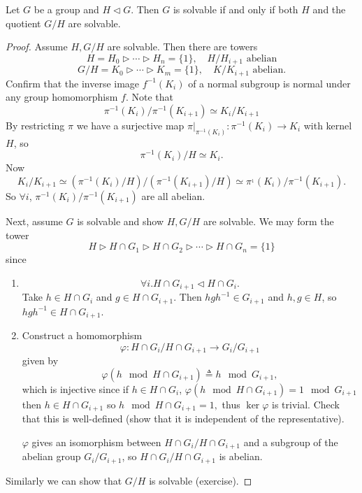 \documentclass{article}
\begin{document}
\begin{prop}
Let $G$ be a group and $H \triangleleft G$. Then $G$ is solvable if
and only if both $H$ and the quotient $G / H$ are solvable.
\end{prop}
\begin{proof}
Assume $H, G / H$ are solvable. Then there are towers
$$
H = H_0 \triangleright \cdots \triangleright H_n = \{ 1 \}, \quad
H/H_{i+1} \text{ abelian} 
$$
$$
G/H = K_0 \triangleright \cdots \triangleright K_m = \{ 1 \}, \quad
K/K_{i+1} \text{ abelian}.
$$
Confirm that the inverse image $f^{-1}(K_i)$ of a normal subgroup is
normal under any group homomorphism $f$. Note that
$$
\pi^{-1}(K_i) / \pi^{-1}(K_{i+1}) \simeq K_i / K_{i+1}
$$
By restricting $\pi$ we have a surjective map
$\pi|_{\pi^{-1}(K_i)} : \pi^{-1}(K_i) \to K_i$ with kernel $H$,
so
$$
\pi^{-1}(K_i) / H \simeq K_i.
$$
Now
$$
K_i / K_{i+1} \simeq (\pi^{-1}(K_i) / H) / (\pi^{-1}(K_{i+1}) / H)
             \simeq \pi^{_1}(K_i) / \pi^{-1}(K_{i+1}).
$$
So $\forall i$, $\pi^{-1}(K_i) / \pi^{-1}(K_{i+1})$ are all abelian.

Next, assume $G$ is solvable and show $H, G/H$ are solvable.
We may form the tower
$$
H \triangleright H \cap G_1 
  \triangleright H \cap G_2 
  \triangleright \cdots 
  \triangleright H \cap G_n = \{ 1 \}
$$
since
\begin{enumerate}
  \item{
    $$
    \forall i . H \cap G_{i+1} \triangleleft H \cap G_i.
    $$
    Take $h \in H \cap G_i$ and $g \in H \cap G_{i+1}$.
    Then $h g h^{-1} \in G_{i+1}$ and $h, g \in H$, so
    $h g h^{-1} \in H \cap G_{i+1}$.
  }
  \item{
    Construct a homomorphism
    $$
    \varphi : H \cap G_i / H \cap G_{i+1} \to G_i / G_{i+1}
    $$
    given by 
    $$
    \varphi(h \mod H \cap G_{i+1}) \triangleq h \mod G_{i+1},
    $$
    which is injective since if $h \in H \cap G_i$,
    $\varphi(h \mod H \cap G_{i+1}) = 1 \mod G_{i+1}$ then
    $h \in H \cap G_{i+1}$ so
    $h \mod H \cap G_{i+1} = 1,$
    thus $\ker \varphi$ is trivial.
    Check that this is well-defined (show that it is independent of
    the representative).

    $\varphi$ gives an isomorphism between 
    $H \cap G_i / H \cap G_{i+1}$ and a subgroup of the abelian group
    $G_i / G_{i+1}$, so $H \cap G_i / H \cap G_{i+1}$ is abelian.
  }
\end{enumerate}
Similarly we can show that $G / H$ is solvable (exercise).
\end{proof}
\end{document}

